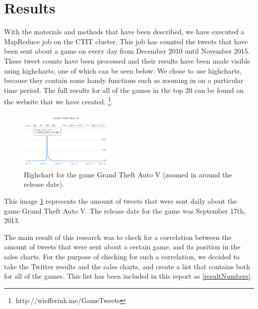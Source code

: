 \section{Results}
With the materials and methods that have been described, we have executed a MapReduce job on the CTIT cluster. This job has counted the tweets that have been sent about a game on every day from December 2010 until November 2015. These tweet counts have been processed and their results have been made visible using highcharts, one of which can be seen below. We chose to use highcharts, because they contain some handy functions such as zooming in on a particular time period. The full results for all of the games in the top 20 can be found on the website that we have created. \footnote{http://wiefferink.me/GameTweets}.

\begin{figure}[!ht]
	\centering
	\includegraphics[width=0.4\textwidth]{highchart-gta3}
	\caption{Highchart for the game Grand Theft Auto V (zoomed in around the release date).}
	\label{highchartgta}
\end{figure}
\FloatBarrier

This image \ref{highchartgta} represents the amount of tweets that were sent daily about the game Grand Theft Auto V.  The release date for the game was September 17th, 2013.

The main result of this research was to check for a correlation between the amount of tweets that were sent about a certain game, and its position in the sales charts. For the purpose of checking for such a correlation, we decided to take the Twitter results and the sales charts, and create a list that contains both for all of the games. This list has been included in this report as \ref{resultNumbers}.